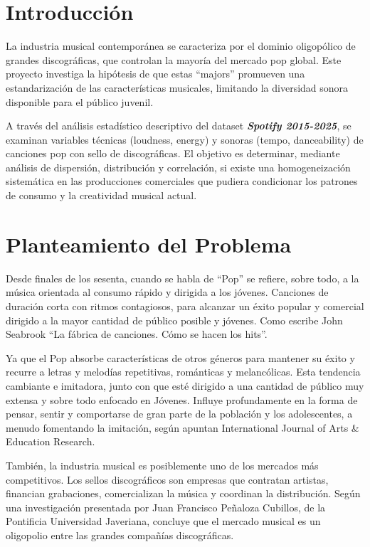 \documentclass[oneside,11pt]{Latex/Classes/PhDthesisPSnPDF}
\begin{document}
\chapter*{Introducción}

La industria musical contemporánea se caracteriza por el dominio
oligopólico de grandes discográficas, que controlan la mayoría del
mercado pop global. Este proyecto investiga la hipótesis de que estas
``majors'' promueven una estandarización de las características
musicales, limitando la diversidad sonora disponible para el público
juvenil.

A través del análisis estadístico descriptivo del dataset
\textbf{\emph{Spotify 2015-2025}}, se examinan variables técnicas
(loudness, energy) y sonoras (tempo, danceability) de canciones pop con
sello de discográficas. El objetivo es determinar, mediante análisis de
dispersión, distribución y correlación, si existe una homogeneización
sistemática en las producciones comerciales que pudiera condicionar los
patrones de consumo y la creatividad musical actual.

\chapter{Planteamiento del Problema}

Desde finales de los sesenta, cuando se habla de ``Pop'' se refiere,
sobre todo, a la música orientada al consumo rápido y dirigida a los
jóvenes. Canciones de duración corta con ritmos contagiosos, para
alcanzar un éxito popular y comercial dirigido a la mayor cantidad de
público posible y jóvenes. Como escribe John Seabrook ``La fábrica de
canciones. Cómo se hacen los hits''.

Ya que el Pop absorbe características de otros géneros para mantener su
éxito y recurre a letras y melodías repetitivas, románticas y
melancólicas. Esta tendencia cambiante e imitadora, junto con que esté
dirigido a una cantidad de público muy extensa y sobre todo enfocado en
Jóvenes. Influye profundamente en la forma de pensar, sentir y
comportarse de gran parte de la población y los adolescentes, a menudo
fomentando la imitación, según apuntan International Journal of Arts \&
Education Research.

También, la industria musical es posiblemente uno de los mercados más
competitivos. Los sellos discográficos son empresas que contratan
artistas, financian grabaciones, comercializan la música y coordinan la
distribución. Según una investigación presentada por Juan Francisco
Peñaloza Cubillos, de la Pontificia Universidad Javeriana, concluye que
el mercado musical es un oligopolio entre las grandes compañías
discográficas.
\end{document}

